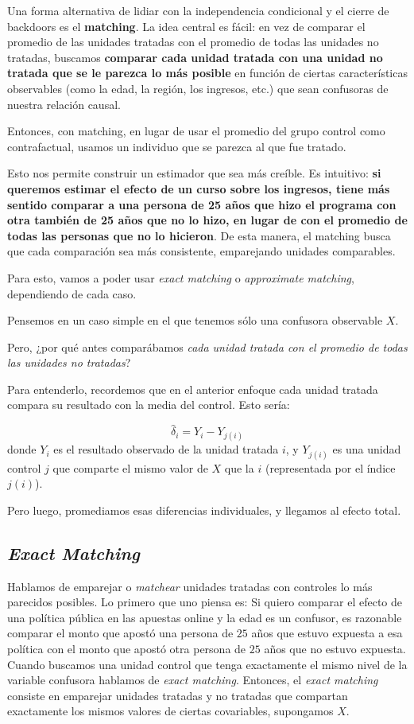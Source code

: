 \documentclass[
  letterpaper,
  DIV=11,
  numbers=noendperiod,
  oneside]{scrreprt}
\begin{document}
Una forma alternativa de lidiar con la independencia condicional y el
cierre de backdoors es el \textbf{matching}. La idea central es fácil:
en vez de comparar el promedio de las unidades tratadas con el promedio
de todas las unidades no tratadas, buscamos \textbf{comparar cada unidad
tratada con una unidad no tratada que se le parezca lo más posible} en
función de ciertas características observables (como la edad, la región,
los ingresos, etc.) que sean confusoras de nuestra relación causal.

Entonces, con matching, en lugar de usar el promedio del grupo control
como contrafactual, usamos un individuo que se parezca al que fue
tratado.

Esto nos permite construir un estimador que sea más creíble. Es
intuitivo: \textbf{si queremos estimar el efecto de un curso sobre los
ingresos, tiene más sentido comparar a una persona de 25 años que hizo
el programa con otra también de 25 años que no lo hizo, en lugar de con
el promedio de todas las personas que no lo hicieron}. De esta manera,
el matching busca que cada comparación sea más consistente, emparejando
unidades comparables.

Para esto, vamos a poder usar \emph{exact matching} o \emph{approximate
matching}, dependiendo de cada caso.

Pensemos en un caso simple en el que tenemos sólo una confusora
observable \(X\).

Pero, ¿por qué antes comparábamos \emph{cada unidad tratada con el
promedio de todas las unidades no tratadas}?

Para entenderlo, recordemos que en el anterior enfoque cada unidad
tratada compara su resultado con la media del control. Esto sería:

\[
\widehat{\delta}_i = Y_i - Y_{j(i)}
\] donde \(Y_i\) es el resultado observado de la unidad tratada \(i\), y
\(Y_{j(i)}\) es una unidad control \(j\) que comparte el mismo valor de
\(X\) que la \(i\) (representada por el índice \(j(i)\)).

Pero luego, promediamos esas diferencias individuales, y llegamos al
efecto total.

\hypertarget{exact-matching}{%
\subsection{\texorpdfstring{\emph{Exact
Matching}}{Exact Matching}}\label{exact-matching}}

Hablamos de emparejar o \emph{matchear} unidades tratadas con controles
lo más parecidos posibles. Lo primero que uno piensa es: Si quiero
comparar el efecto de una política pública en las apuestas online y la
edad es un confusor, es razonable comparar el monto que apostó una
persona de \(25\) años que estuvo expuesta a esa política con el monto
que apostó otra persona de \(25\) años que no estuvo expuesta. Cuando
buscamos una unidad control que tenga exactamente el mismo nivel de la
variable confusora hablamos de \emph{exact matching}. Entonces, el
\emph{exact matching} consiste en emparejar unidades tratadas y no
tratadas que compartan exactamente los mismos valores de ciertas
covariables, supongamos \(X\).
\end{document}
